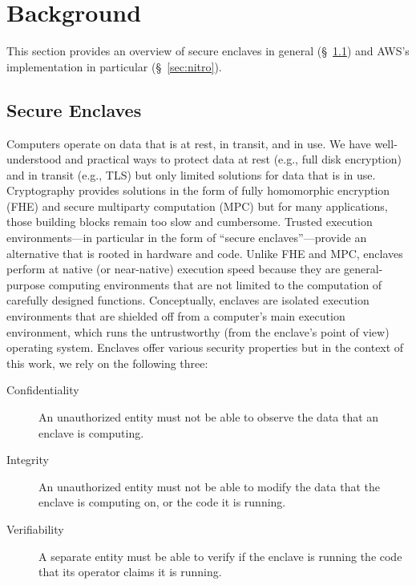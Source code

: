 \section{Background}
\label{sec:background}

This section provides an overview of secure enclaves in general
(\S~\ref{sec:enclaves}) and AWS's implementation in particular
(\S~\ref{sec:nitro}).

\subsection{Secure Enclaves}
\label{sec:enclaves}

Computers operate on data that is at rest, in transit, and in use.  We have
well-understood and practical ways to protect data at rest (e.g., full disk
encryption) and in transit (e.g., TLS) but only limited solutions for data that
is in use.  Cryptography provides solutions in the form of fully homomorphic
encryption (FHE) and secure multiparty computation (MPC) but for many
applications, those building blocks remain too slow and cumbersome.  Trusted
execution environments---in particular in the form of ``secure
enclaves''---provide an alternative that is rooted in hardware and code.  Unlike
FHE and MPC, enclaves perform at native (or near-native) execution speed because
they are general-purpose computing environments that are not limited to the
computation of carefully designed functions.  Conceptually, enclaves are
isolated execution environments that are shielded off from a computer's main
execution environment, which runs the untrustworthy (from the enclave's point of
view) operating system.  Enclaves offer various security properties but in the
context of this work, we rely on the following three:

\begin{description}
  \item[Confidentiality] An unauthorized entity must not be able to observe the
    data that an enclave is computing.

  \item[Integrity] An unauthorized entity must not be able to modify the data
    that the enclave is computing on, or the code it is running.

  \item[Verifiability] A separate entity must be able to verify if the enclave
    is running the code that its operator claims it is running.
\end{description}

